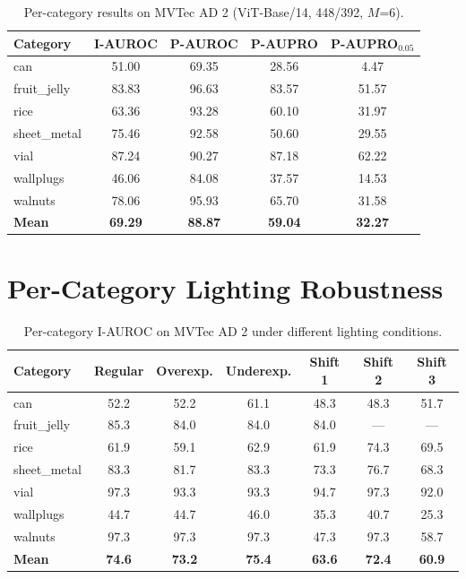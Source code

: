 \documentclass[10pt]{article} %
\begin{document}
\begin{table}[H]
\caption{Per-category results on MVTec AD 2 (ViT-Base/14, 448/392, $M$=6).}
\label{tab:ad2_per_cat}
\begin{center}
\small
\begin{tabular}{lcccc}
\toprule
Category & I-AUROC & P-AUROC & P-AUPRO & P-AUPRO$_{0.05}$ \\
\midrule
can          & 51.00 & 69.35 & 28.56 & 4.47 \\
fruit\_jelly & 83.83 & 96.63 & 83.57 & 51.57 \\
rice         & 63.36 & 93.28 & 60.10 & 31.97 \\
sheet\_metal & 75.46 & 92.58 & 50.60 & 29.55 \\
vial         & 87.24 & 90.27 & 87.18 & 62.22 \\
wallplugs    & 46.06 & 84.08 & 37.57 & 14.53 \\
walnuts      & 78.06 & 95.93 & 65.70 & 31.58 \\
\midrule
\textbf{Mean} & \textbf{69.29} & \textbf{88.87} & \textbf{59.04} & \textbf{32.27} \\
\bottomrule
\end{tabular}
\end{center}
\end{table}

\section{Per-Category Lighting Robustness}
\label{app:lightshift}

\begin{table}[H]
\caption{Per-category I-AUROC on MVTec AD 2 under different lighting conditions.}
\label{tab:lightshift_iauroc}
\begin{center}
\small
\begin{tabular}{lcccccc}
\toprule
Category & Regular & Overexp. & Underexp. & Shift 1 & Shift 2 & Shift 3 \\
\midrule
can          & 52.2 & 52.2 & 61.1 & 48.3 & 48.3 & 51.7 \\
fruit\_jelly & 85.3 & 84.0 & 84.0 & 84.0 & --- & --- \\
rice         & 61.9 & 59.1 & 62.9 & 61.9 & 74.3 & 69.5 \\
sheet\_metal & 83.3 & 81.7 & 83.3 & 73.3 & 76.7 & 68.3 \\
vial         & 97.3 & 93.3 & 93.3 & 94.7 & 97.3 & 92.0 \\
wallplugs    & 44.7 & 44.7 & 46.0 & 35.3 & 40.7 & 25.3 \\
walnuts      & 97.3 & 97.3 & 97.3 & 47.3 & 97.3 & 58.7 \\
\midrule
\textbf{Mean} & \textbf{74.6} & \textbf{73.2} & \textbf{75.4} & \textbf{63.6} & \textbf{72.4} & \textbf{60.9} \\
\bottomrule
\end{tabular}
\end{center}
\end{table}
\end{document}
